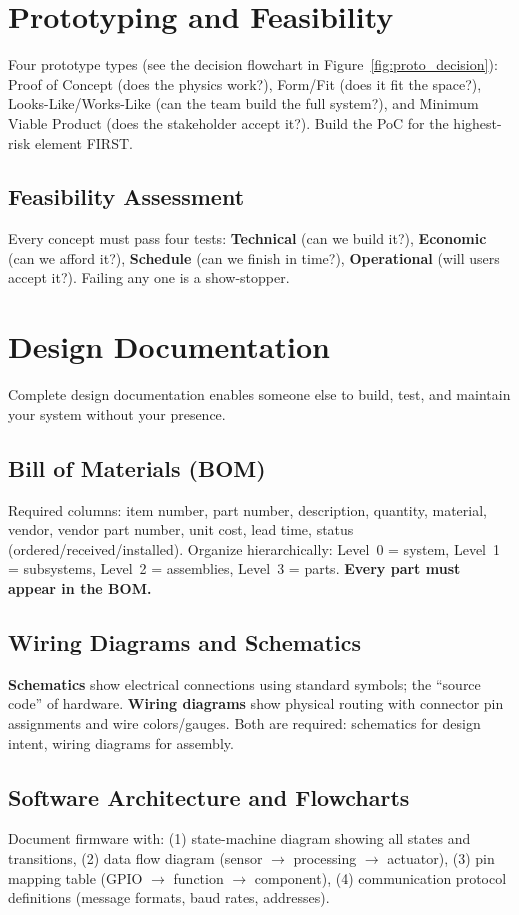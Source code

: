 \documentclass[11pt,letterpaper,twoside,openany]{book}
\begin{document}
\section{Prototyping and Feasibility}
Four prototype types (see the decision flowchart in Figure~\ref{fig:proto_decision}): Proof of Concept (does the physics work?), Form/Fit (does it fit the space?), Looks-Like/Works-Like (can the team build the full system?), and Minimum Viable Product (does the stakeholder accept it?). Build the PoC for the highest-risk element FIRST.

\subsection{Feasibility Assessment}
Every concept must pass four tests: \textbf{Technical} (can we build it?), \textbf{Economic} (can we afford it?), \textbf{Schedule} (can we finish in time?), \textbf{Operational} (will users accept it?). Failing any one is a show-stopper.


\section{Design Documentation}
Complete design documentation enables someone else to build, test, and maintain your system without your presence.

\subsection{Bill of Materials (BOM)}
Required columns: item number, part number, description, quantity, material, vendor, vendor part number, unit cost, lead time, status (ordered/received/installed). Organize hierarchically: Level~0 = system, Level~1 = subsystems, Level~2 = assemblies, Level~3 = parts. \textbf{Every part must appear in the BOM.}

\subsection{Wiring Diagrams and Schematics}
\textbf{Schematics} show electrical connections using standard symbols; the ``source code'' of hardware. \textbf{Wiring diagrams} show physical routing with connector pin assignments and wire colors/gauges. Both are required: schematics for design intent, wiring diagrams for assembly.

\subsection{Software Architecture and Flowcharts}
Document firmware with: (1) state-machine diagram showing all states and transitions, (2) data flow diagram (sensor $\to$ processing $\to$ actuator), (3) pin mapping table (GPIO $\to$ function $\to$ component), (4) communication protocol definitions (message formats, baud rates, addresses).
\end{document}
